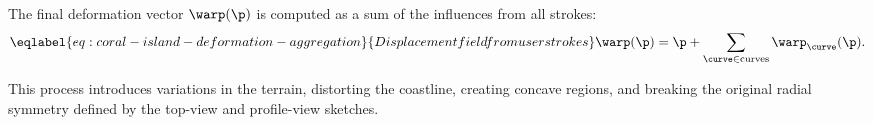 


The final deformation vector $\warp(\p)$ is computed as a sum of the influences from all strokes: 
\begin{align}
    \eqlabel{eq:coral-island-deformation-aggregation}{Displacement field from user strokes}
    \warp(\p) = \p + \sum_{\curve \in \text{curves}} \warp_\curve(\p) .
\end{align}

This process introduces variations in the terrain, distorting the coastline, creating concave regions, and breaking the original radial symmetry defined by the top-view and profile-view sketches.

